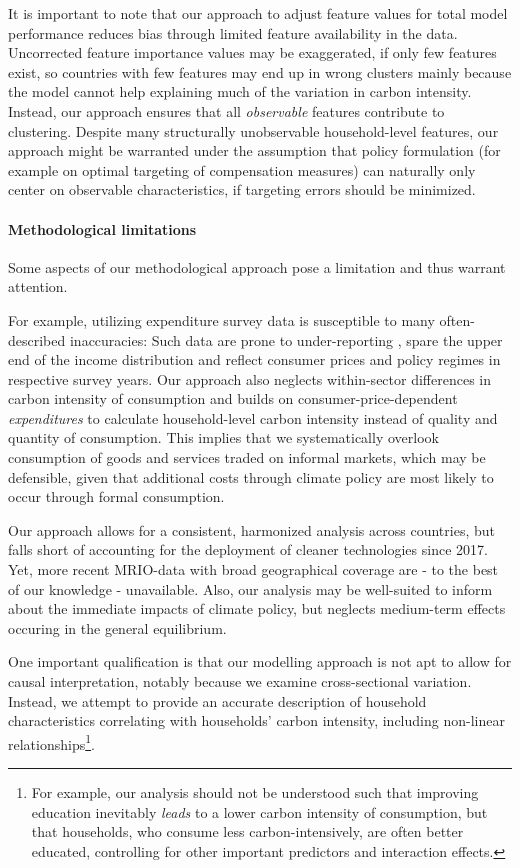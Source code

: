\documentclass[12pt, a4paper]{article}
\begin{document}
It is important to note that our approach to adjust feature values for total model performance reduces bias through limited feature availability in the data. Uncorrected feature importance values may be exaggerated, if only few features exist, so countries with few features may end up in wrong clusters mainly because the model cannot help explaining much of the variation in carbon intensity. Instead, our approach ensures that all \textit{observable} features contribute to clustering. Despite many structurally unobservable household-level features, our approach might be warranted under the assumption that policy formulation (for example on optimal targeting of compensation measures) can naturally only center on observable characteristics, if targeting errors should be minimized.

\paragraph{Methodological limitations}

Some aspects of our methodological approach pose a limitation and thus warrant attention.

For example, utilizing expenditure survey data is susceptible to many often-described inaccuracies: Such data are prone to under-reporting \autocite{Meyer.2015}, spare the upper end of the income distribution \autocite{Blanchet.2022} and reflect consumer prices and policy regimes in respective survey years. Our approach also neglects within-sector differences in carbon intensity of consumption and builds on consumer-price-dependent \textit{expenditures} to calculate household-level carbon intensity instead of quality and quantity of consumption. This implies that we systematically overlook consumption of goods and services traded on informal markets, which may be defensible, given that additional costs through climate policy are most likely to occur through formal consumption.

Our approach allows for a consistent, harmonized analysis across countries, but falls short of accounting for the deployment of cleaner technologies since 2017. Yet, more recent MRIO-data with broad geographical coverage are - to the best of our knowledge - unavailable. Also, our analysis may be well-suited to inform about the immediate impacts of climate policy, but neglects medium-term effects occuring in the general equilibrium. 

One important qualification is that our modelling approach is not apt to allow for causal interpretation, notably because we examine cross-sectional variation. Instead, we attempt to provide an accurate description of household characteristics correlating with households' carbon intensity, including non-linear relationships\footnote{For example, our analysis should not be understood such that improving education inevitably \textit{leads} to a lower carbon intensity of consumption, but that households, who consume less carbon-intensively, are often better educated, controlling for other important predictors and interaction effects.}.
\end{document}
